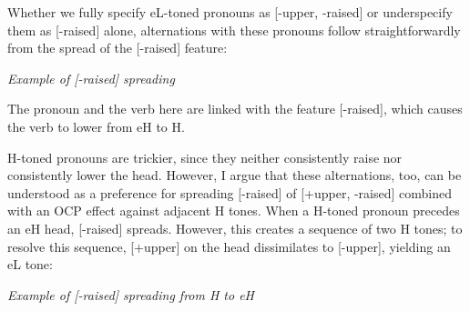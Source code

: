 \documentclass[output=paper]{langsci/langscibook}
\begin{document}
Whether we fully specify eL-toned pronouns as [-upper, -raised] or underspecify them as [-raised] alone, alternations with these pronouns follow straightforwardly from the spread of the [-raised] feature:

\ea\label{ex:mcpherson:22} {\it Example of [-raised] spreading} \\
\z
{}

The pronoun and the verb here are linked with the feature [-raised], which causes the verb to lower from eH to H. 

H-toned pronouns are trickier, since they neither consistently raise nor consistently lower the head. However, I argue that these alternations, too, can be understood as a preference for spreading [-raised] of [+upper, -raised] combined with an OCP effect against adjacent H tones. When a H-toned pronoun precedes an eH head, [-raised] spreads. However, this creates a sequence of two H tones; to resolve this sequence, [+upper] on the head dissimilates to [-upper], yielding an eL tone:

\ea\label{ex:mcpherson:23} {\it Example of [-raised] spreading from H to eH} \\
\z
{}
\end{document}
